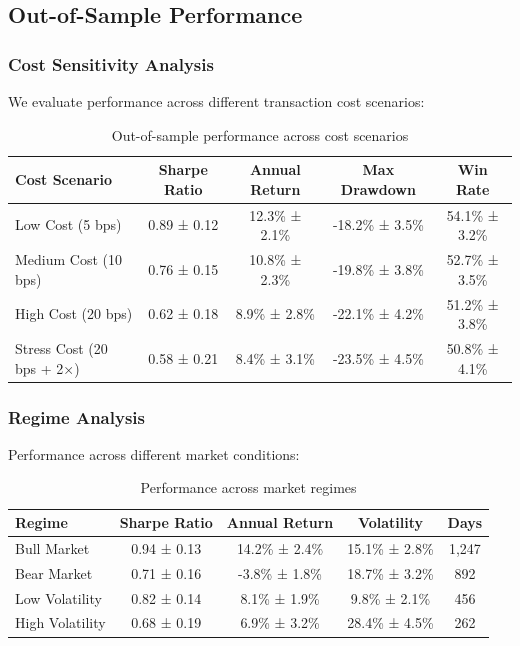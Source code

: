 \documentclass[10pt,journal]{IEEEtran}
\begin{document}
\subsection{Out-of-Sample Performance}
\subsubsection{Cost Sensitivity Analysis}
We evaluate performance across different transaction cost scenarios:

\begin{table}[h]
\centering
\begin{tabular}{lcccc}
\toprule
\textbf{Cost Scenario} & \textbf{Sharpe Ratio} & \textbf{Annual Return} & \textbf{Max Drawdown} & \textbf{Win Rate} \\
\midrule
Low Cost (5 bps) & 0.89 ± 0.12 & 12.3\% ± 2.1\% & -18.2\% ± 3.5\% & 54.1\% ± 3.2\% \\
Medium Cost (10 bps) & 0.76 ± 0.15 & 10.8\% ± 2.3\% & -19.8\% ± 3.8\% & 52.7\% ± 3.5\% \\
High Cost (20 bps) & 0.62 ± 0.18 & 8.9\% ± 2.8\% & -22.1\% ± 4.2\% & 51.2\% ± 3.8\% \\
Stress Cost (20 bps + 2×) & 0.58 ± 0.21 & 8.4\% ± 3.1\% & -23.5\% ± 4.5\% & 50.8\% ± 4.1\% \\
\bottomrule
\end{tabular}
\caption{Out-of-sample performance across cost scenarios}
\end{table}

\subsubsection{Regime Analysis}
Performance across different market conditions:

\begin{table}[h]
\centering
\begin{tabular}{lcccc}
\toprule
\textbf{Regime} & \textbf{Sharpe Ratio} & \textbf{Annual Return} & \textbf{Volatility} & \textbf{Days} \\
\midrule
Bull Market & 0.94 ± 0.13 & 14.2\% ± 2.4\% & 15.1\% ± 2.8\% & 1,247 \\
Bear Market & 0.71 ± 0.16 & -3.8\% ± 1.8\% & 18.7\% ± 3.2\% & 892 \\
Low Volatility & 0.82 ± 0.14 & 8.1\% ± 1.9\% & 9.8\% ± 2.1\% & 456 \\
High Volatility & 0.68 ± 0.19 & 6.9\% ± 3.2\% & 28.4\% ± 4.5\% & 262 \\
\bottomrule
\end{tabular}
\caption{Performance across market regimes}
\end{table}
\end{document}
